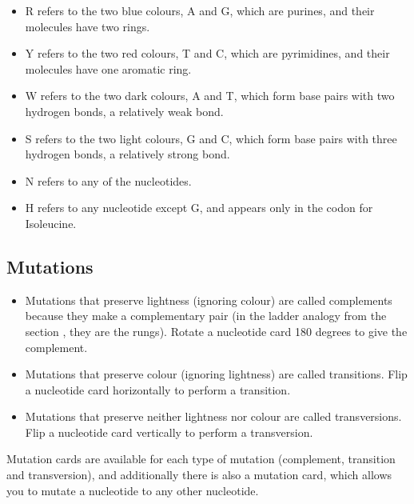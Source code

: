 \documentclass[a4paper,11pt,oneside]{memoir}
\begin{document}
\begin{itemize}
    \item R refers to the two blue colours, A and G, which are purines, and their molecules have two rings.
    \item Y refers to the two red colours, T and C, which are pyrimidines, and their molecules have one aromatic ring.
    \item W refers to the two dark colours, A and T, which form base pairs with two hydrogen bonds, a relatively weak bond.
    \item S refers to the two light colours, G and C, which form base pairs with three hydrogen bonds, a relatively strong bond.
    \item N refers to any of the nucleotides.
    \item H refers to any nucleotide except G, and appears only in the codon for Isoleucine.
\end{itemize}


\subsection*{Mutations}

\begin{itemize}
    \item Mutations that preserve lightness (ignoring colour) are called complements because they make a complementary pair (in the ladder analogy from the section \textbf{}, they are the rungs).  Rotate a nucleotide card 180 degrees to give the complement.
    \item Mutations that preserve colour (ignoring lightness) are called transitions.  Flip a nucleotide card horizontally to perform a transition.
    \item Mutations that preserve neither lightness nor colour are called transversions.  Flip a nucleotide card vertically to perform a transversion. \\
\end{itemize}

Mutation cards are available for each type of mutation (complement, transition and transversion), and additionally there is also a mutation card, which allows you to mutate a nucleotide to any other nucleotide. 
\end{document}
